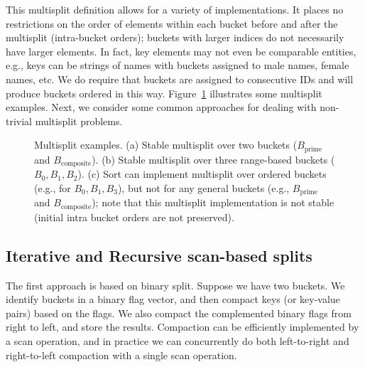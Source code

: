 This multisplit definition allows for a variety of implementations. It places no restrictions on the order of elements within each bucket before and after the multisplit (intra-bucket orders); buckets with larger indices do not necessarily have larger elements. In fact, key elements may not even be comparable entities, e.g., keys can be strings of names with buckets assigned to male names, female names, etc. We do require that buckets are assigned to consecutive IDs and will produce buckets ordered in this way.
Figure~\ref{fig:multisplit_example} illustrates some multisplit examples.
Next, we consider some common approaches for dealing with non-trivial multisplit problems.

\begin{figure}
  \centering
  
  \caption{Multisplit examples. (a) Stable multisplit over two buckets ($B_\text{prime}$ and $B_\text{composite}$). (b) Stable multisplit over three range-based buckets ($B_0, B_1, B_2$). (c) Sort can implement multisplit over ordered buckets (e.g., for $B_0, B_1, B_3$), but not for any general buckets (e.g., $B_\text{prime}$ and $B_\text{composite}$); note that this multisplit implementation is not stable (initial intra bucket orders are not preserved).\label{fig:multisplit_example}}
\end{figure}

\subsection{Iterative and Recursive scan-based splits}\label{sec:scan_split}
The first approach is based on binary split. Suppose we have two buckets. We identify buckets in a binary flag vector, and then compact keys (or key-value pairs) based on the flags. We also compact the complemented binary flags from right to left, and store the results. Compaction can be efficiently implemented by a scan operation, and in practice we can concurrently do both left-to-right and right-to-left compaction with a single scan operation.

